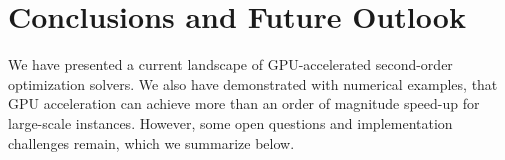 \documentclass{article}
\begin{document}


\section{Conclusions and Future Outlook}\label{eqn:conclusion}
We have presented a current landscape of GPU-accelerated second-order optimization solvers.
We also have demonstrated with numerical examples, that GPU acceleration can achieve more than an order of magnitude speed-up for large-scale instances.
However, some open questions and implementation challenges remain, which we summarize below.
\end{document}
